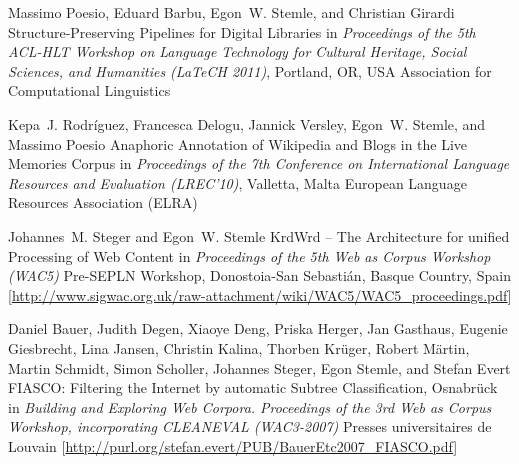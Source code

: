 \documentclass[11pt,a4paper]{moderncv}
\begin{document}
    {Massimo Poesio, Eduard Barbu, Egon~W. Stemle, and Christian Girardi}
    {Structure-Preserving Pipelines for Digital Libraries}
    {\small in {\em Proceedings of the 5th ACL-HLT Workshop on Language Technology for Cultural Heritage, Social Sciences, and Humanities (LaTeCH 2011)}, Portland, OR, USA}
    {\small Association for Computational Linguistics}
    {}

    {Kepa~J. Rodr{\'i}guez, Francesca Delogu, Jannick Versley, Egon~W. Stemle, and Massimo Poesio}
    {Anaphoric Annotation of Wikipedia and Blogs in the Live Memories Corpus}
    {\small in {\em Proceedings of the 7th Conference on International Language Resources and Evaluation (LREC'10)}, Valletta, Malta}
    {\small European Language Resources Association (ELRA)}
    {}

    {Johannes~M. Steger and Egon~W. Stemle}
    {{KrdWrd} -- The Architecture for unified Processing of Web Content}
    {\small in {\em Proceedings of the 5th Web as Corpus Workshop (WAC5)}}
    {\small Pre-SEPLN Workshop, Donostoia-San Sebasti{\'a}n, Basque Country, Spain}
    {[\url{http://www.sigwac.org.uk/raw-attachment/wiki/WAC5/WAC5_proceedings.pdf}]}

    {Daniel Bauer, Judith Degen, Xiaoye Deng, Priska Herger, Jan Gasthaus, Eugenie Giesbrecht, Lina Jansen, Christin Kalina, Thorben Kr{\"u}ger, Robert M{\"a}rtin, Martin Schmidt, Simon Scholler, Johannes Steger, Egon Stemle, and Stefan Evert}
    {FIASCO: Filtering the Internet by automatic Subtree Classification, Osnabr{\"u}ck}
    {\small in {\em Building and Exploring Web Corpora. Proceedings of the 3rd Web as Corpus Workshop, incorporating CLEANEVAL (WAC3-2007)}}
    {\small Presses universitaires de Louvain}
    {[\url{http://purl.org/stefan.evert/PUB/BauerEtc2007_FIASCO.pdf}]}
\end{document}
